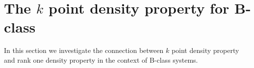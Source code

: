 \documentclass[12pt,oneside,a4paper]{amsart}
\begin{document}



    \section{The \texorpdfstring{$k$}{k} point density property for B-class}
      \label{sec:kpd}
      In this section we investigate the connection between $k$ point density property and
        rank one density property in the context of B-class systems.
\end{document}
